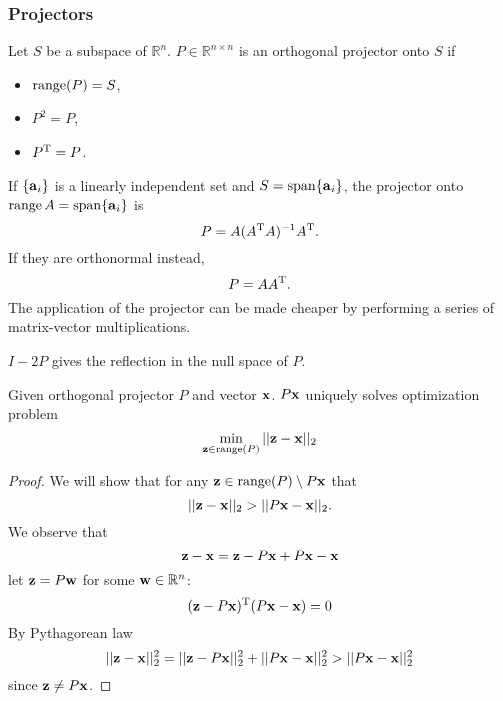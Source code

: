 \documentclass{article}
\begin{document}
\subsubsection{Projectors}
\begin{definition}
    Let $S$ be a subspace of $\mathbb{R}^n$. $P\in\mathbb{R}^{n\times n}$ is an orthogonal projector onto $S$ if
    \begin{itemize}
        \item $\operatorname{range}(P)=S$,
        \item $P^2=P$,
        \item $P^{\text{T}}=P$.
    \end{itemize}
\end{definition}

\begin{definition}
    If $\{\bm{\mathrm{a}}_i\}$ is a linearly independent set and $S=\operatorname{span}\{\bm{\mathrm{a}}_i\}$, the projector onto $\operatorname{range}{A}=\operatorname{span}\{\bm{\mathrm{a}}_i\}$ is
    \begin{equation}
        P=A(A^{\text{T}} A)^{-1}A^{\text{T}}.
    \end{equation}
    If they are orthonormal instead, 
    \begin{equation}
        P=AA^{\text{T}}.
    \end{equation}
    The application of the projector can be made cheaper by performing a series of matrix-vector multiplications.
\end{definition}
\begin{corollary}
    $I-2P$ gives the reflection in the null space of $P$.
\end{corollary}

\begin{theorem}
    Given orthogonal projector $P$ and vector $\bm{\mathrm{x}}$. $P\bm{\mathrm{x}}$ uniquely solves optimization problem
    \begin{equation}
        \min_{\bm{\mathrm{z}}\in\operatorname{range}(P)}||\bm{\mathrm{z}}-\bm{\mathrm{x}}||_2
    \end{equation}
\end{theorem}
\begin{proof}
    We will show that for any $\bm{\mathrm{z}}\in\operatorname{range}(P)\setminus P\bm{\mathrm{x}}$ that
    \begin{equation}
        ||\bm{\mathrm{z}}-\bm{\mathrm{x}}||_2>||P\bm{\mathrm{x}}-\bm{\mathrm{x}}||_2.
    \end{equation}
    We observe that
    \begin{equation}
        \bm{\mathrm{z}}-\bm{\mathrm{x}}=\bm{\mathrm{z}}-P\bm{\mathrm{x}}+P\bm{\mathrm{x}}-\bm{\mathrm{x}}
    \end{equation}
    let $\bm{\mathrm{z}}=P\bm{\mathrm{w}}$ for some $\bm{\mathrm{w}}\in\mathbb{R}^n$:
    \begin{equation}
        (\bm{\mathrm{z}}-P\bm{\mathrm{x}})^{\text{T}}(P\bm{\mathrm{x}}-\bm{\mathrm{x}})=0
    \end{equation}
    By Pythagorean law
    \begin{equation}
        ||\bm{\mathrm{z}}-\bm{\mathrm{x}}||_2^2=||\bm{\mathrm{z}}-P\bm{\mathrm{x}}||_2^2+||P\bm{\mathrm{x}}-\bm{\mathrm{x}}||_2^2>||P\bm{\mathrm{x}}-\bm{\mathrm{x}}||_2^2
    \end{equation}
    since $\bm{\mathrm{z}}\neq P\bm{\mathrm{x}}$.
\end{proof}
\end{document}
